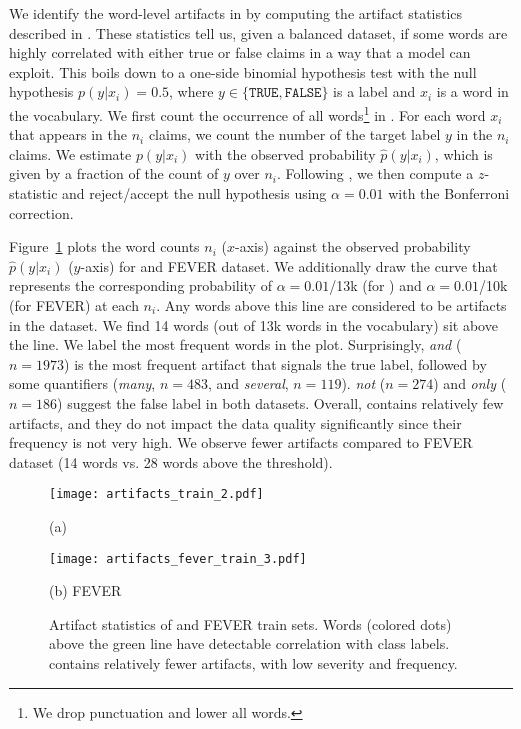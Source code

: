We identify the word-level artifacts in \ours by computing the artifact statistics described in \citet{Matt_Gardner_2021}. These statistics tell us, given a balanced dataset, if some words are highly correlated with either true or false claims in a way that a model can exploit. This boils down to a one-side binomial hypothesis test with the null hypothesis $p (y | x_i) = 0.5$, where $y \in \{\texttt{TRUE}, \texttt{FALSE}\}$ is a label and $x_i$ is a word in the vocabulary. We first count the occurrence of all words\footnote{We drop punctuation and lower all words.} in \textsc{\ours}. For each word $x_i$ that appears in the $n_i$ claims, we count the number of the target label $y$ in the $n_i$ claims. We estimate $p (y | x_i)$ with the observed probability $\hat p (y | x_i)$, which is given by a fraction of the count of $y$ over $n_i$. Following \cite{Matt_Gardner_2021}, we then compute a $z$-statistic and reject/accept the null hypothesis using $\alpha = 0.01$ with the Bonferroni correction.

Figure~\ref{fig:competency} plots the word counts $n_i$ ($x$-axis) against the observed probability $\hat p (y | x_i)$ ($y$-axis) for \ours and FEVER dataset. We additionally draw the curve that represents the corresponding probability of $\alpha = 0.01$/13k (for \oursno) and $\alpha = 0.01$/10k (for FEVER) at each $n_i$. Any words above this line are considered to be artifacts in the dataset. We find 14 words (out of 13k words in the vocabulary) sit above the line. We label the most frequent words in the plot. Surprisingly, \emph{and} ($n=1973$) is the most frequent artifact that signals the true label, followed by some quantifiers (\emph{many}, $n=483$, and \emph{several}, $n=119$). \emph{not} ($n=274$) and \emph{only} ($n=186$) suggest the false label in both datasets. Overall, \textsc{\ours} contains relatively few artifacts, and they do not impact the data quality significantly since their frequency is not very high. We observe fewer artifacts compared to FEVER dataset (14 words vs. 28 words above the threshold).

\begin{figure}
     \centering
     \begin{minipage}{0.48\textwidth}
         \centering
         \texttt{[image: artifacts\_train\_2.pdf]}
         \caption*{(a) \ours}
         \label{fig1:dev}
     \end{minipage}
     \hspace{10pt}
     \begin{minipage}{0.48\textwidth}
         \centering
         \texttt{[image: artifacts\_fever\_train\_3.pdf]}
         \caption*{(b) FEVER}
         \label{fig:contrast}
     \end{minipage}
     \caption{Artifact statistics of \ours and FEVER train sets. Words (colored dots) above the green line have detectable correlation with class labels. \ours contains relatively fewer artifacts, with low severity and frequency.}
     \label{fig:competency}
\end{figure}

